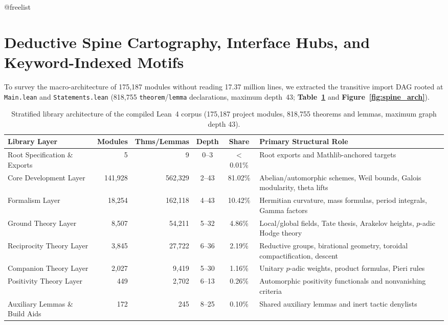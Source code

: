 \documentclass[11pt,a4paper]{article}
\makeatletter
\providecommand{\FloatBarrier}{%
  \par
  \expandafter\ifx\csname @freelist\endcsname\relax\else
    \ifx\@deferlist\@empty\else
      \clearpage
    \fi
  \fi
}
\let\orig@section\section
\renewcommand{\section}{\FloatBarrier\orig@section}
\makeatother
\begin{document}
\section{Deductive Spine Cartography, Interface Hubs, and Keyword-Indexed Motifs}

To survey the macro-architecture of 175,187 modules without reading 17.37 million lines, we extracted the transitive import DAG rooted at \texttt{Main.lean} and \texttt{Statements.lean} (818,755 \texttt{theorem}/\texttt{lemma} declarations, maximum depth~43; \textbf{Table~\ref{tab:library_strata}} and \textbf{Figure~\ref{fig:spine_arch}}).

\begin{table}[!htb]
\centering
\caption{Stratified library architecture of the compiled Lean~4 corpus (175,187 project modules, 818,755 theorems and lemmas, maximum graph depth 43).}
\label{tab:library_strata}
\footnotesize
\setlength{\tabcolsep}{4pt}
\begin{tabular}{@{}lrrcc>{\raggedright\arraybackslash}p{}@{}}
\toprule
\textbf{Library Layer} & \textbf{Modules} & \textbf{Thms/Lemmas} & \textbf{Depth} & \textbf{Share} & \textbf{Primary Structural Role} \\
\midrule
Root Specification \& Exports & 5 & 9 & 0--3 & $<$0.01\% & Root exports and Mathlib-anchored targets \\
Core Development Layer & 141,928 & 562,329 & 2--43 & 81.02\% & Abelian/automorphic schemes, Weil bounds, Galois modularity, theta lifts \\
Formalism Layer & 18,254 & 162,118 & 4--43 & 10.42\% & Hermitian curvature, mass formulas, period integrals, Gamma factors \\
Ground Theory Layer & 8,507 & 54,211 & 5--32 & 4.86\% & Local/global fields, Tate thesis, Arakelov heights, $p$-adic Hodge theory \\
Reciprocity Theory Layer & 3,845 & 27,722 & 6--36 & 2.19\% & Reductive groups, birational geometry, toroidal compactification, descent \\
Companion Theory Layer & 2,027 & 9,419 & 5--30 & 1.16\% & Unitary $p$-adic weights, product formulas, Pieri rules \\
Positivity Theory Layer & 449 & 2,702 & 6--13 & 0.26\% & Automorphic positivity functionals and nonvanishing criteria \\
Auxiliary Lemmas \& Build Aids & 172 & 245 & 8--25 & 0.10\% & Shared auxiliary lemmas and inert tactic denylists \\
\bottomrule
\end{tabular}
\end{table}
\end{document}
